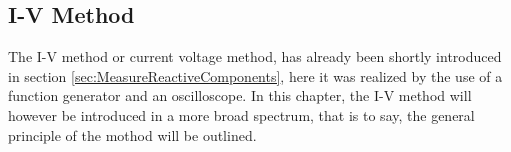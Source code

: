 \subsection{I-V Method} \label{ssec:IVMethod}
The I-V method or current voltage method, has already been shortly introduced in section \ref{sec:MeasureReactiveComponents}, here it was realized by the use of a function generator and an oscilloscope. In this chapter, the I-V method will however be introduced in a more broad spectrum, that is to say, the general principle of the mothod will be outlined.
